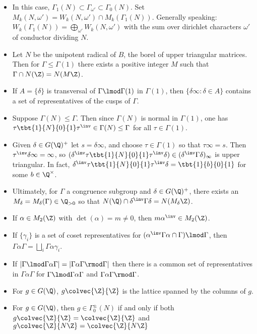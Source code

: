 \documentclass[11pt]{amsart}
\begin{document}
\begin{itemize}
   \item In this case, $\Gamma_1(N) \subset \Gamma_{\omega'}\subset \Gamma_0(N)$. Set $M_k(N,\omega') = W_k(N,\omega')\cap M_k(\Gamma_1(N))$. Generally speaking: $W_k(\Gamma_1(N))= \bigoplus_{\omega' } W_k(N,\omega')$ with the sum over dirichlet characters $\omega'$ of conductor dividing $N$. 
   \item Let $N$ be the unipotent radical of $B$, the borel of upper triangular matrices. Then for $\Gamma\leq \Gamma(1)$ there exists a positive integer $M$ such that $\Gamma \cap N(\Z) = N(M\Z)$.
   \item If $A=\{ \delta\}$ is transversal of $\Gamma \lmod \Gamma(1)$ in $\Gamma(1)$, then $\{ \delta \infty: \delta \in A\}$ contains a set of representatives of the cusps of $\Gamma$. 
   \item Suppose $\Gamma(N) \leq \Gamma$. Then since $\Gamma(N)$ is normal in $\Gamma(1)$, one has $\tau \tbt{1}{N}{0}{1} \tau^\inv  \in \Gamma(N)\leq \Gamma$ for all $\tau \in \Gamma(1)$.
   \item Given $\delta\in G(\Q)^+$ let $s=\delta \infty$, and choose $\tau \in \Gamma(1)$ so that $\tau \infty =s$. Then $\tau^\inv \delta \infty =\infty$, so $(\delta^\inv \tau \tbt{1}{N}{0}{1} \tau^\inv \delta) \in (\delta^\inv \Gamma \delta)_\infty$ is upper triangular. In fact,  $\delta^\inv \tau \tbt{1}{N}{0}{1} \tau^\inv \delta= \tbt{1}{b}{0}{1}$ for some $b\in \Q^\times$.
   \item Ultimately, for $\Gamma$ a congruence subgroup and $\delta \in G(\Q)^+$, there exists an $M_\delta=M_\delta(\Gamma) \in \Q_{>0}$ so that $N(\Q) \cap  \delta^\inv \Gamma \delta = N(M_\delta \Z)$.
   \item If $\alpha \in M_2(\Z)$ with $\det(\alpha)=m \neq 0$, then $m\alpha^\inv \in M_2(\Z)$. 
   \item If $\{\gamma_i\}$ is a set of coset representatives for $(\alpha^\inv \Gamma \alpha \cap \Gamma ) \lmod \Gamma$, then $\Gamma \alpha \Gamma = \bigsqcup_i \Gamma \alpha \gamma_i$. 
   \item If $|\Gamma \lmod \Gamma \alpha \Gamma|= |\Gamma \alpha \Gamma \rmod \Gamma|$ then there is a common set of representatives in $\Gamma \alpha \Gamma$ for $\Gamma \lmod \Gamma \alpha \Gamma$ and $\Gamma \alpha \Gamma \rmod \Gamma$.
   \item For $g\in G(\Q)$, $g\colvec{\Z}{\Z}$ is the lattice spanned by the columns of $g$. 
   \item For $g\in G(\Q)$, then $g\in \Gamma_0^\pm (N)$ if and only if both $g\colvec{\Z}{\Z} = \colvec{\Z}{\Z}$ and $g\colvec{\Z}{N\Z} = \colvec{\Z}{N\Z}$

\end{itemize}
\end{document}
